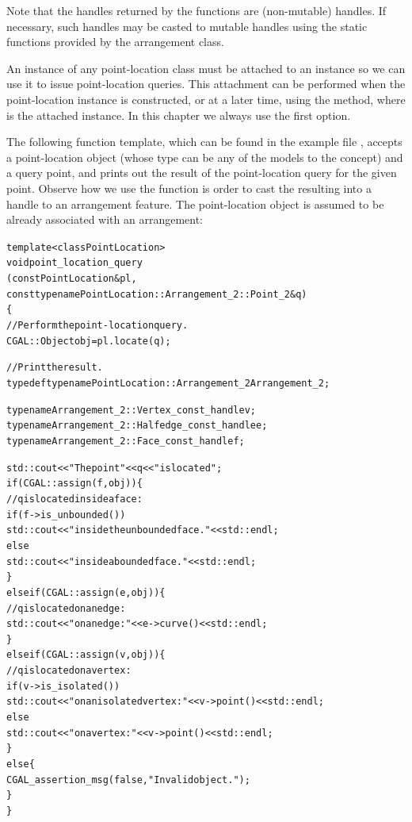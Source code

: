 Note that the handles returned by the  functions are
 (non-mutable) handles. If necessary, such handles may
be casted to mutable handles using the static functions
 provided by the
arrangement class.

An instance of any point-location class must be attached to an
 instance so we can use it to issue point-location
queries. This attachment can be performed when the point-location
instance is constructed, or at a later time, using the 
method, where  is the attached  instance.
In this chapter we always use the first option.

The following function template, which can be found in the example
file , accepts a point-location object
(whose type can be any of the models to the
 concept) and a query point, and
prints out the result of the point-location query for the given
point. Observe how we use the function  is order
to cast the resulting  into a handle to an arrangement
feature. The point-location object  is assumed to be already
associated with an arrangement:

\begin{alltt}
template <class PointLocation>
void point_location_query
        (const PointLocation& pl,
         const typename PointLocation::Arrangement_2::Point_2& q)
\{
  // Perform the point-location query.
  CGAL::Object obj = pl.locate (q);

  // Print the result.
  typedef typename PointLocation::Arrangement_2  Arrangement_2;

  typename Arrangement_2::Vertex_const_handle    v;
  typename Arrangement_2::Halfedge_const_handle  e;
  typename Arrangement_2::Face_const_handle      f;

  std::cout << "The point " << q << " is located ";
  if (CGAL::assign (f, obj)) \{
    // q is located inside a face:
    if (f->is_unbounded())
      std::cout << "inside the unbounded face." << std::endl;
    else
      std::cout << "inside a bounded face." << std::endl;
  \}
  else if (CGAL::assign (e, obj)) \{
    // q is located on an edge:
    std::cout << "on an edge: " << e->curve() << std::endl;
  \}
  else if (CGAL::assign (v, obj)) \{
    // q is located on a vertex:
    if (v->is_isolated())
      std::cout << "on an isolated vertex: " << v->point() << std::endl;
    else
      std::cout << "on a vertex: " << v->point() << std::endl;
  \}
  else \{
    CGAL_assertion_msg (false, "Invalid object.");
  \}
\}
\end{alltt}

